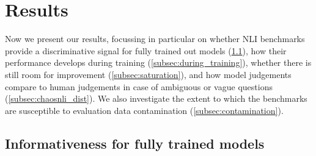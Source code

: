 \section{Results}

Now we present our results, focussing in particular on whether NLI benchmarks provide a discriminative signal for fully trained out models (\cref{subsec:fully_trained}), how their performance develops during training (\cref{subsec:during_training}), whether there is still room for improvement (\cref{subsec:saturation}), and how model judgements compare to human judgements in case of ambiguous or vague questions (\cref{subsec:chaosnli_dist}).
We also investigate the extent to which the benchmarks are susceptible to evaluation data contamination (\cref{subsec:contamination}).


\subsection{Informativeness for fully trained models}\label{subsec:fully_trained}

